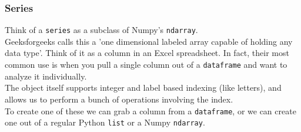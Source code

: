 \documentclass[english, 10pt]{article}
\begin{document}
\subsubsection{Series}

Think of a \texttt{series} as a subclass of Numpy's \texttt{ndarray}.\\

Geeksforgeeks calls this a 'one dimensional labeled array capable of holding any data type'. Think of it as a column in an Excel spreadsheet. In fact, their most common use is when you pull a single column out of a \texttt{dataframe} and want to analyze it individually.\\

The object itself supports integer and label based indexing (like letters), and allows us to perform a bunch of operations involving the index.\\

To create one of these we can grab a column from a \texttt{dataframe}, or we can create one out of a regular Python \texttt{list} or a Numpy  \texttt{ndarray}.
\end{document}
